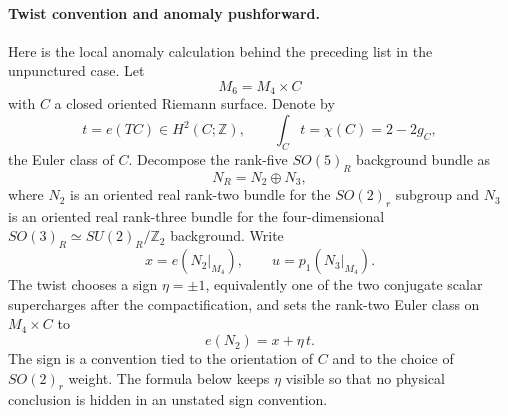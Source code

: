 \paragraph{Twist convention and anomaly pushforward.}
Here is the local anomaly calculation behind the preceding list in the
unpunctured case.  Let
\[
  M_6=M_4\times C
\]
with \(C\) a closed oriented Riemann surface.  Denote by
\[
  t=e(TC)\in H^2(C;\mathbb Z),
  \qquad
  \int_C t=\chi(C)=2-2g_C,
\]
the Euler class of \(C\).  Decompose the rank-five \(SO(5)_R\) background
bundle as
\[
  N_R=N_2\oplus N_3 ,
\]
where \(N_2\) is an oriented real rank-two bundle for the \(SO(2)_r\)
subgroup and \(N_3\) is an oriented real rank-three bundle for the
four-dimensional \(SO(3)_R\simeq SU(2)_R/\mathbb Z_2\) background.  Write
\[
  x=e(N_2|_{M_4}),\qquad u=p_1(N_3|_{M_4}).
\]
The twist chooses a sign \(\eta=\pm1\), equivalently one of the two
conjugate scalar supercharges after the compactification, and sets the
rank-two Euler class on \(M_4\times C\) to
\begin{equation}
  e(N_2)=x+\eta\,t .
  \label{eq:six-d-class-s-twist-euler-class}
\end{equation}
The sign is a convention tied to the orientation of \(C\) and to the choice
of \(SO(2)_r\) weight.  The formula below keeps \(\eta\) visible so that no
physical conclusion is hidden in an unstated sign convention.

